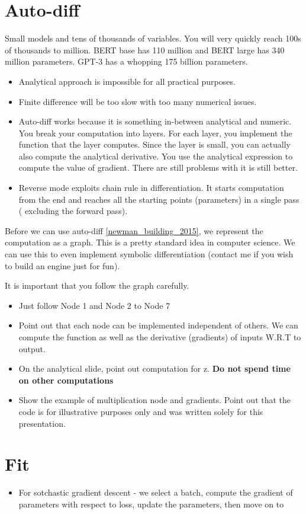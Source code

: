\documentclass[14pt, twocolumn]{article}
\begin{document}
\section*{Auto-diff}
Small models and tens of thousands of variables. You will very quickly reach 
100s of thousands to million. BERT base has 110 million and BERT large has 
340 million parameters. GPT-3 has a whopping 175 billion parameters. 
\begin{itemize}
	\item Analytical approach is impossible for all practical purposes. 
	\item Finite difference will be too slow with too many numerical issues. 
	\item Auto-diff works because it is something in-between analytical and 
	numeric. You break your computation into layers. For each layer, you implement 
	the function that the layer computes. Since the layer is small, you can actually 
	also compute the analytical derivative. You use the analytical expression to 
	compute the value of gradient. There are still problems with it is still better. 
	\item Reverse mode exploits chain rule in differentiation. It starts computation 
	from the end and reaches all the starting points (parameters) in a single pass (
	excluding the forward pass).  
\end{itemize}
Before we can use auto-diff \ref{newman_building_2015}, we represent the computation as a graph. This is a pretty 
standard idea in computer science. We can use this to even implement symbolic 
differentiation (contact me if you wish to build an engine just for fun). 

It is important  that you follow the graph carefully. 

\begin{itemize}
	\item Just follow Node 1 and Node 2 to Node 7
	\item Point out that each node can be implemented independent of others. We 
	can compute the function as well as the derivative (gradients) of inputs W.R.T
	to output. 
	\item On the analytical slide, point out computation for z. {\bf Do not spend 
	time on other computations}
	\item Show the example of multiplication node and gradients. Point out that 
	the code is for illustrative purposes only and was written solely for this 
	presentation.
\end{itemize}

\section*{Fit}
\begin{itemize}
	\item For sotchastic gradient  descent - we select a batch, compute the gradient 
	of parameters with respect to loss, update the parameters, then move on to
\end{itemize}

\nocite{dumoulin2018guide}
\nocite{726791}
\nocite{43405}
\nocite{45818}
\nocite{10.5555/3086952}
\nocite{NIPS2014_5346}
 

\end{document}
